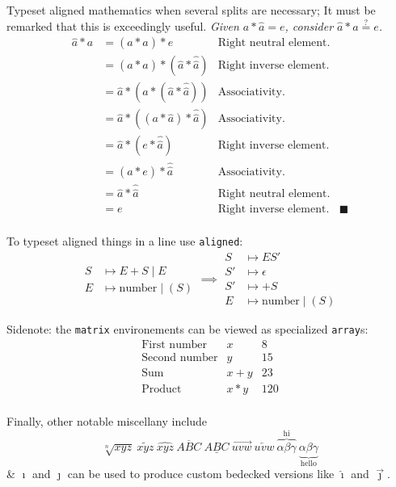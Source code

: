 Typeset aligned mathematics when several splits are necessary;
It must be remarked that this is exceedingly useful.
\def\QED{\blacksquare}%
\textit{Given $a*\widehat{a} = e$, consider $\widehat{a}*a \stackrel?= e$.}
\begin{align*}
	\widehat{a}*a
	&= (\widehat{a}*a)*e &\text{Right neutral element.} \\
	&=(\widehat{a}*a)*(\widehat{a}*\widehat{\widehat{a}}) &\text{Right inverse element.} \\
	&= \widehat{a}*(a*(\widehat{a}*\widehat{\widehat{a}})) &\text{Associativity.} \\
	&= \widehat{a}*((a*\widehat{a})*\widehat{\widehat{a}}) &\text{Associativity.} \\
	&= \widehat{a}*(e*\widehat{\widehat{a}}) &\text{Right inverse element.} \\
	&= (\widehat{a}*e)*\widehat{\widehat{a}} &\text{Associativity.} \\
	&= \widehat{a}*\widehat{\widehat{a}} &\text{Right neutral element.} \\
	&= e &\text{Right inverse element.}  &\QED \\
\end{align*}

To typeset aligned things in a line use \texttt{aligned}:
$$
\begin{aligned}
	S &\mapsto E + S \mid E\\
	E &\mapsto \textrm{number} \mid (S)
\end{aligned}
\implies
\begin{aligned}
	S &\mapsto ES'\\
	S' &\mapsto \epsilon\\
	S' &\mapsto +S\\
	E &\mapsto \textrm{number} \mid (S)
\end{aligned}
$$

Sidenote: the \texttt{matrix} environements can be viewed as specialized \texttt{array}s:
$$
\begin{array}{lcr}
	\mbox{First number} & x & 8 \\
	\mbox{Second number} & y & 15 \\
	\mbox{Sum} & x+y & 23 \\
	\mbox{Product} & x*y & 120 \\
\end{array}
$$

Finally, other notable miscellany include
$$
\sqrt[n]{xyz}\ \widetilde{xyz}\ \widehat{xyz}\ \overline{ABC}\ \underline{ABC}\ \overrightarrow{uvw}\ \overleftarrow{uvw}\ \overbrace{\alpha\beta\gamma}^{\text{hi}}\ \underbrace{\alpha\beta\gamma}_{\text{hello}}
$$
\& $\imath$ and $\jmath$ can be used to produce custom bedecked versions like $\hat\imath$ and $\vec\jmath$.

